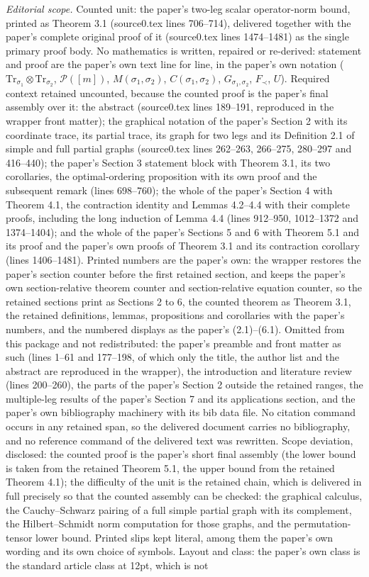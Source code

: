 \documentclass[10pt,a4paper]{amsart}
\numberwithin{equation}{section}
\theoremstyle{plain}
\def\cP{\mathcal P}
\def\Tr{\mathrm {Tr}}
\begin{document}
\noindent\textit{Editorial scope.} Counted unit: the paper's two-leg scalar operator-norm bound, printed as Theorem 3.1 (source0.tex lines 706--714), delivered together with the paper's complete original proof of it (source0.tex lines 1474--1481) as the single primary proof body. No mathematics is written, repaired or re-derived: statement and proof are the paper's own text line for line, in the paper's own notation ($\Tr_{\sigma_1}\otimes\Tr_{\sigma_2}$, $\cP([m])$, $M(\sigma_1,\sigma_2)$, $C(\sigma_1,\sigma_2)$, $G_{\sigma_1,\sigma_2}$, $F_\prec$, $U$). Required context retained uncounted, because the counted proof is the paper's final assembly over it: the abstract (source0.tex lines 189--191, reproduced in the wrapper front matter); the graphical notation of the paper's Section 2 with its coordinate trace, its partial trace, its graph for two legs and its Definition 2.1 of simple and full partial graphs (source0.tex lines 262--263, 266--275, 280--297 and 416--440); the paper's Section 3 statement block with Theorem 3.1, its two corollaries, the optimal-ordering proposition with its own proof and the subsequent remark (lines 698--760); the whole of the paper's Section 4 with Theorem 4.1, the contraction identity and Lemmas 4.2--4.4 with their complete proofs, including the long induction of Lemma 4.4 (lines 912--950, 1012--1372 and 1374--1404); and the whole of the paper's Sections 5 and 6 with Theorem 5.1 and its proof and the paper's own proofs of Theorem 3.1 and its contraction corollary (lines 1406--1481). Printed numbers are the paper's own: the wrapper restores the paper's section counter before the first retained section, and keeps the paper's own section-relative theorem counter and section-relative equation counter, so the retained sections print as Sections 2 to 6, the counted theorem as Theorem 3.1, the retained definitions, lemmas, propositions and corollaries with the paper's numbers, and the numbered displays as the paper's (2.1)--(6.1). Omitted from this package and not redistributed: the paper's preamble and front matter as such (lines 1--61 and 177--198, of which only the title, the author list and the abstract are reproduced in the wrapper), the introduction and literature review (lines 200--260), the parts of the paper's Section 2 outside the retained ranges, the multiple-leg results of the paper's Section 7 and its applications section, and the paper's own bibliography machinery with its bib data file. No citation command occurs in any retained span, so the delivered document carries no bibliography, and no reference command of the delivered text was rewritten. Scope deviation, disclosed: the counted proof is the paper's short final assembly (the lower bound is taken from the retained Theorem 5.1, the upper bound from the retained Theorem 4.1); the difficulty of the unit is the retained chain, which is delivered in full precisely so that the counted assembly can be checked: the graphical calculus, the Cauchy--Schwarz pairing of a full simple partial graph with its complement, the Hilbert--Schmidt norm computation for those graphs, and the permutation-tensor lower bound. Printed slips kept literal, among them the paper's own wording and its own choice of symbols. Layout and class: the paper's own class is the standard article class at 12pt, which is not 
\end{document}
